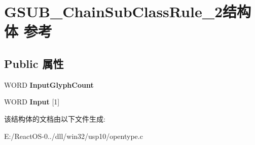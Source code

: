 \hypertarget{struct_g_s_u_b___chain_sub_class_rule__2}{}\section{G\+S\+U\+B\+\_\+\+Chain\+Sub\+Class\+Rule\+\_\+2结构体 参考}
\label{struct_g_s_u_b___chain_sub_class_rule__2}
\subsection*{Public 属性}
\begin{DoxyCompactItemize}
\item 
\mbox{\label{struct_g_s_u_b___chain_sub_class_rule__2_a20bb3adab539190843a1169c38720ed3}} 
W\+O\+RD {\bfseries Input\+Glyph\+Count}
\item 
\mbox{\label{struct_g_s_u_b___chain_sub_class_rule__2_ace64f305c9adbffc89be078f7be77641}} 
W\+O\+RD {\bfseries Input} \mbox{[}1\mbox{]}
\end{DoxyCompactItemize}


该结构体的文档由以下文件生成\+:\begin{DoxyCompactItemize}
\item 
E\+:/\+React\+O\+S-\/0../dll/win32/usp10/opentype.\+c\end{DoxyCompactItemize}
